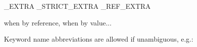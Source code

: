 
\_EXTRA
\_STRICT\_EXTRA
\_REF\_EXTRA

when by reference, when by value...

Keyword name abbreviations are allowed if unambiguous, e.g.:
